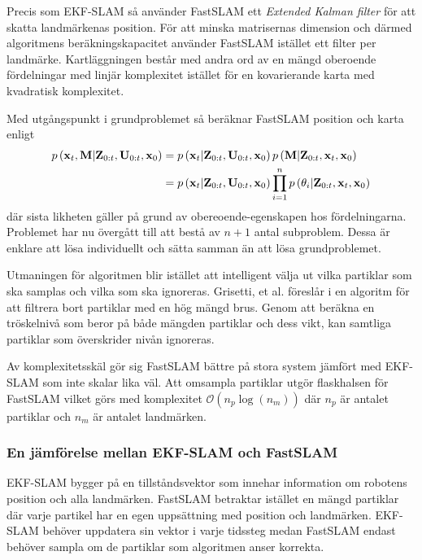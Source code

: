 \documentclass[11pt]{article}
\newcommand{\bfr}[1]{\textbf{\textrm{{#1}}}}
\begin{document}
\begin{flushleft}
Precis som EKF-SLAM så använder FastSLAM ett \emph{Extended Kalman filter} för att skatta landmärkenas position. För att minska matrisernas dimension och därmed algoritmens beräkningskapacitet använder FastSLAM istället ett filter per landmärke. Kartläggningen består med andra ord av en mängd oberoende fördelningar med linjär komplexitet istället för en kovarierande karta med kvadratisk komplexitet.

Med utgångspunkt i grundproblemet så beräknar FastSLAM position och karta enligt
\begin{align*}
	p\left(\textbf{\textrm{x}}_{t},\textbf{\textrm{M}} \vert \textbf{\textrm{Z}}_{0:t}, \textbf{\textrm{U}}_{0:t}, \textbf{\textrm{x}}_0 \right) &= p\left(\textbf{\textrm{x}}_{t}\vert \textbf{\textrm{Z}}_{0:t}, \textbf{\textrm{U}}_{0:t}, \textbf{\textrm{x}}_0 \right)p\left(\textbf{\textrm{M}} \vert \textbf{\textrm{Z}}_{0:t}, \bfr{x}_{t}, \textbf{\textrm{x}}_0 \right) \\
	&= p\left(\textbf{\textrm{x}}_{t}\vert \textbf{\textrm{Z}}_{0:t}, \textbf{\textrm{U}}_{0:t}, \textbf{\textrm{x}}_0 \right)\prod_{i=1}^{n} p\left(\theta_{i} \vert \textbf{\textrm{Z}}_{0:t}, \bfr{x}_{t}, \textbf{\textrm{x}}_0 \right)
\end{align*}
där sista likheten gäller på grund av obereoende-egenskapen hos fördelningarna. Problemet har nu övergått till att bestå av $n + 1$ antal subproblem. Dessa är enklare att lösa individuellt och sätta samman än att lösa grundproblemet.

Utmaningen för algoritmen blir istället att intelligent välja ut vilka partiklar som ska samplas och vilka som ska ignoreras. Grisetti, et al. föreslår i \cite{reo} en algoritm för att filtrera bort partiklar med en hög mängd brus. Genom att beräkna en tröskelnivå som beror på både mängden partiklar och dess vikt, kan samtliga partiklar som överskrider nivån ignoreras. 

Av komplexitetsskäl gör sig FastSLAM bättre på stora system jämfört med EKF-SLAM som inte skalar lika väl. Att omsampla partiklar utgör flaskhalsen för FastSLAM vilket görs med komplexitet $\mathcal{O}\left(n_{p}\log\left(n_{m}\right)\right)$ där $n_p$ är antalet partiklar och $n_m$ är antalet landmärken.

\subsubsection{En jämförelse mellan EKF-SLAM och FastSLAM}
EKF-SLAM bygger på en tillståndsvektor som innehar information om robotens position och alla landmärken. FastSLAM betraktar istället en mängd partiklar där varje partikel har en egen uppsättning med position och landmärken. EKF-SLAM behöver uppdatera sin vektor i varje tidssteg medan FastSLAM endast behöver sampla om de partiklar som algoritmen anser korrekta. 


\end{flushleft}
\end{document}
